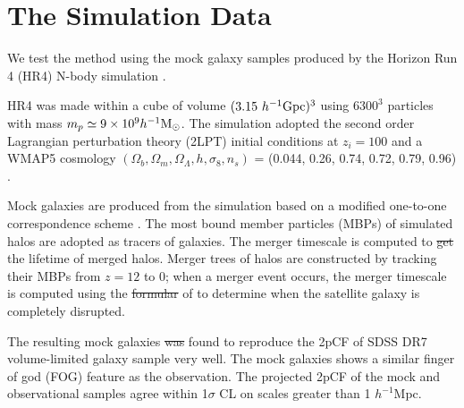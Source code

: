 \documentclass[iop]{emulateapj}
\newcommand{\hMsun}{{\ifmmode{h^{-1}{\rm
        {M_{\odot}}}}\else{$h^{-1}{\rm{M_{\odot}}}$~}\fi}}
\providecommand{\DIFadd}[1]{{\protect\color{blue}\uwave{#1}}} %
\providecommand{\DIFdel}[1]{{\protect\color{red}\sout{#1}}}                      %
\providecommand{\DIFaddbegin}{} %
\providecommand{\DIFaddend}{} %
\providecommand{\DIFdelbegin}{} %
\providecommand{\DIFdelend}{} %
\begin{document}
\section{The Simulation Data}\label{sec:data}

We test the method using the mock galaxy samples produced by the Horizon Run 4  (HR4) N-body simulation \citep{hr4,hong2016}.

HR4 was made within a cube of volume $({3.15}\ h^{-1}\rm Gpc)^3$ using  $6300^3$ particles with mass $m_p\simeq 9 \times 10^9 \hMsun$.
The simulation adopted the second order Lagrangian perturbation theory (2LPT) initial conditions at $z_{i}=100$
and a WMAP5 cosmology $(\Omega_{b},\Omega_{m},\Omega_\Lambda,h,\sigma_8,n_s)$  = (0.044, 0.26, 0.74, 0.72, 0.79, 0.96) \citep{komatsu 2011}.

Mock galaxies are produced from the simulation based on a modified one-to-one correspondence scheme \citep{hong2016}. 
The most bound member particles (MBPs) of simulated halos are adopted as tracers of galaxies.
The merger timescale is computed to \DIFdelbegin \DIFdel{get }\DIFdelend \DIFaddbegin \DIFadd{obtain }\DIFaddend the lifetime of merged halos.
Merger trees of halos are constructed by tracking their MBPs from $z = 12$ to 0;
when a merger event occurs, the merger timescale is computed using the \DIFdelbegin \DIFdel{formular }\DIFdelend \DIFaddbegin \DIFadd{formula }\DIFaddend of \cite{jiang2008} to 
determine when the satellite galaxy is completely disrupted.

The resulting mock galaxies \DIFdelbegin \DIFdel{was }\DIFdelend \DIFaddbegin \DIFadd{were }\DIFaddend found to reproduce the 2pCF of \DIFaddbegin \DIFadd{the }\DIFaddend SDSS DR7 volume-limited galaxy sample \citep{zehavi2011} very well.
The mock galaxies shows a similar finger of god (FOG) feature \citep{FOG} as the observation.
The projected 2pCF of the mock and observational samples agree within 1$\sigma$ CL
on scales greater than 1 ${h^{-1}}$Mpc.
\end{document}
